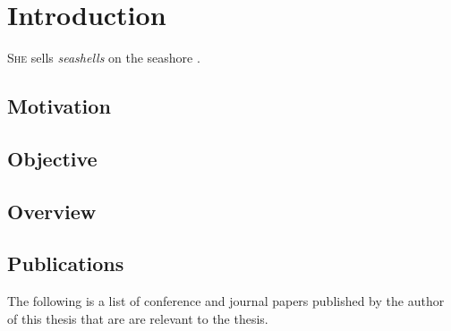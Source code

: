 \chapter{Introduction}
\textsc{She} sells \emph{seashells} on the seashore \cite{goodfellow2016}.

\section{Motivation}
\lipsum[1]

\section{Objective}
\lipsum[1]

\section{Overview}
\lipsum[1]

\section{Publications}
The following is a list of conference and journal papers published by the author
of this thesis that are are relevant to the thesis.

\printbibliography[heading=none,keyword=own]
